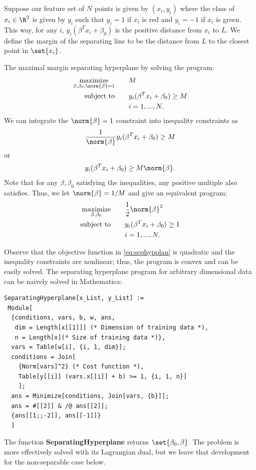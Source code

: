 \documentclass[10pt]{article}
\begin{document}
Suppose our feature set of $N$ points is given by $(x_{i},y_{i})$ where the class of $x_{i}\in\R^{2}$ is given by $y_{i}$ such that $y_{i}=1$ if $x_{i}$  is red and $y_{i}=-1$ if $x_{i}$ is green. This way, for any $i$, $y_{i}(\beta^{T}x_{i}+\beta_{0})$ is the positive distance from $x_{i}$ to $L$. We define the margin of the separating line to be the distance from $L$ to the closest point in $\set{x_{i}}$. 

The maximal margin separating hyperplane by solving the program:
\begin{align*}
	\operatorname*{maximize}_{\beta,\beta_{0}, \norm{\beta}=1}\qquad & M \\
	\text{subject to}\qquad & y_{i} (\beta^{T}x_{i}+\beta_{0})\geq M \\
	&i=1,...,N.
\end{align*}
We can integrate the $\norm{\beta}=1$ constraint into inequality constraints as
\[
	\frac{1}{\norm{\beta}}y_{i} (\beta^{T}x_{i}+\beta_{0})\geq M 
\]
or 
\[
	y_{i} (\beta^{T}x_{i}+\beta_{0})\geq M \norm{\beta}.
\]
Note that for any $\beta, \beta_{0}$ satisfying the inequalities, any positive multiple also satisfies. Thus, we let $\norm{\beta}=1/M$ and give an equivalent program:
\begin{align}
	\label{eq:sephypplan}\operatorname*{maximize}_{\beta,\beta_{0}}\qquad & \frac{1}{2}\norm{\beta}^{2} \\
	\text{subject to}\qquad & y_{i} (\beta^{T}x_{i}+\beta_{0})\geq 1 \nonumber\\
	&i=1,...,N.\nonumber
\end{align}

Observe that the objective function in \eqref{eq:sephypplan} is quadratic and the inequality constraints are nonlinear; thus, the program is convex and can be easily solved. The separating hyperplane program for arbitrary dimensional data can be naively solved in Mathematica:

\begin{lstlisting}
SeparatingHyperplane[x_List, y_List] :=
 Module[
  {conditions, vars, b, w, ans,
   dim = Length[x[[1]]] (* Dimension of training data *),
   n = Length[x](* Size of training data *)},
  vars = Table[w[i], {i, 1, dim}];
  conditions = Join[
    {Norm[vars]^2} (* Cost function *),
    Table[y[[i]] (vars.x[[i]] + b) >= 1, {i, 1, n}] 
    ];
  ans = Minimize[conditions, Join[vars, {b}]];
  ans = #[[2]] & /@ ans[[2]];
  {ans[[1;;-2]], ans[[-1]]}
  ]
\end{lstlisting}

The function \textbf{SeparatingHyperplane} returns $\set{\beta_{0}, \beta}$. The problem is more effectively solved with its Lagrangian dual, but we leave that development for the non-separable case below. 
\end{document}
